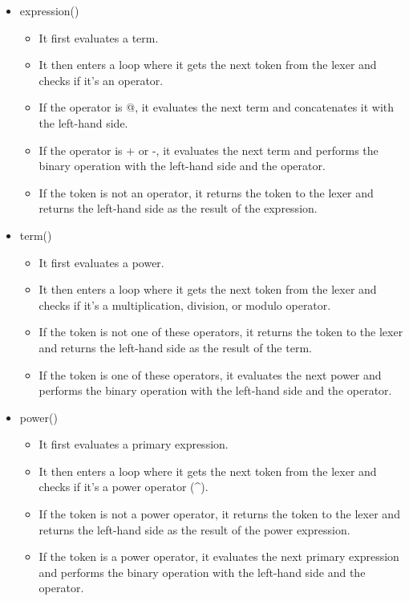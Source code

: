 \begin{itemize}
    \item expression{()}
        \begin{itemize}
            \item It first evaluates a term.
            \item It then enters a loop where it gets the next token from the lexer and checks if it's an operator.
            \item If the operator is @, it evaluates the next term and concatenates it with the left-hand side.
            \item If the operator is + or -, it evaluates the next term and performs the binary operation with the left-hand side and the operator.
            \item If the token is not an operator, it returns the token to the lexer and returns the left-hand side as the result of the expression.
        \end{itemize}
    \item term{()}
        \begin{itemize}
            \item It first evaluates a power.
            \item It then enters a loop where it gets the next token from the lexer and checks if it's a multiplication, division, or modulo operator.
            \item If the token is not one of these operators, it returns the token to the lexer and returns the left-hand side as the result of the term.
            \item If the token is one of these operators, it evaluates the next power and performs the binary operation with the left-hand side and the operator.
        \end{itemize}
    \item power{()}
        \begin{itemize}
            \item It first evaluates a primary expression.
            \item It then enters a loop where it gets the next token from the lexer and checks if it's a power operator (\^{}).
            \item If the token is not a power operator, it returns the token to the lexer and returns the left-hand side as the result of the power expression.
            \item If the token is a power operator, it evaluates the next primary expression and performs the binary operation with the left-hand side and the operator.

\end{itemize}
\end{itemize}

